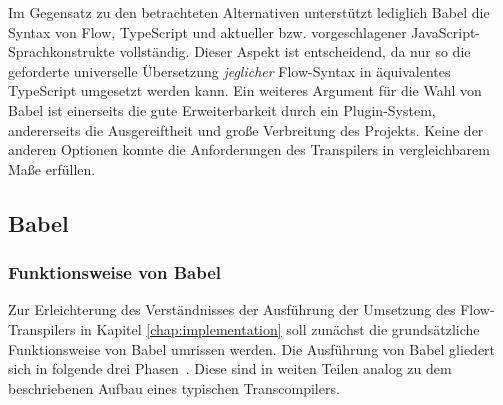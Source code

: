 Im Gegensatz zu den betrachteten Alternativen unterstützt lediglich Babel die Syntax von Flow, TypeScript und aktueller bzw. vorgeschlagener JavaScript-Sprachkonstrukte vollständig. Dieser Aspekt ist entscheidend, da nur so die geforderte universelle Übersetzung \emph{jeglicher} Flow-Syntax in äquivalentes TypeScript umgesetzt werden kann. Ein weiteres Argument für die Wahl von Babel ist einerseits die gute Erweiterbarkeit durch ein Plugin-System, andererseits die Ausgereiftheit und große Verbreitung des Projekts. Keine der anderen Optionen konnte die Anforderungen des Transpilers in vergleichbarem Maße erfüllen.

\subsection{Babel}
\label{sec:babel}

\subsubsection{Funktionsweise von Babel}

Zur Erleichterung des Verständnisses der Ausführung der Umsetzung des Flow-Transpilers in Kapitel \ref{chap:implementation} soll zunächst die grundsätzliche Funktionsweise von Babel umrissen werden. Die Ausführung von Babel gliedert sich in folgende drei Phasen~\autocite{BABEL:HANDBOOK}. Diese sind in weiten Teilen analog zu dem beschriebenen Aufbau eines typischen Transcompilers.


